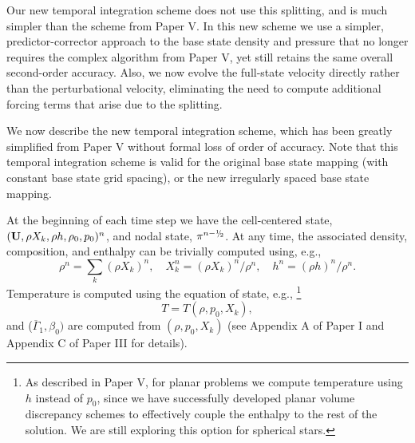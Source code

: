 \documentclass{aastex62}
\newcommand{\sfrac}[2]{\mathchoice
  {\kern0em\raise.5ex\hbox{\the\scriptfont0 #1}\kern-.15em/
   \kern-.15em\lower.25ex\hbox{\the\scriptfont0 #2}}
  {\kern0em\raise.5ex\hbox{\the\scriptfont0 #1}\kern-.15em/
   \kern-.15em\lower.25ex\hbox{\the\scriptfont0 #2}}
  {\kern0em\raise.5ex\hbox{\the\scriptscriptfont0 #1}\kern-.2em/
   \kern-.15em\lower.25ex\hbox{\the\scriptscriptfont0 #2}}
  {#1\!/#2}}
\newcommand{\myhalf}{\sfrac{1}{2}}
\newcommand{\Ub}{{\bf{U}}}
\newcommand{\gammaonebar}{\overline{\Gamma}_1}
\begin{document}
Our new temporal integration scheme does not use this splitting, and is much simpler than the scheme from Paper V.
In this new scheme we use a simpler, predictor-corrector approach to the base state density and pressure that no longer requires the complex algorithm from Paper V, yet still retains the same overall second-order accuracy.
Also, we now evolve the full-state velocity directly rather than the perturbational velocity, eliminating the need to compute additional forcing terms that arise due to the splitting.

We now describe the new temporal integration scheme, which has been greatly simplified
from Paper V without formal loss of order of accuracy.
Note that this temporal integration scheme is valid for the original base state mapping (with constant base state grid spacing), or the new irregularly spaced base state mapping.

At the beginning of each time step we have the cell-centered state,
$(\Ub,\rho X_k,\rho h,\rho_0,p_0)^n$, and nodal state, $\pi^{n-\myhalf}$.
At any time, the associated density, composition, and enthalpy can be trivially computed using, e.g.,
\begin{equation}
\rho^n = \sum_k(\rho X_k)^n, \quad
X_k^n = (\rho X_k)^n / \rho^n, \quad
h^n = (\rho h)^n / \rho^n.
\end{equation}
Temperature is computed using the equation of state, e.g.,
\footnote{As described in Paper V, for planar problems we compute temperature using $h$ instead of $p_0$, since we have successfully developed planar volume discrepancy schemes to effectively couple the enthalpy to the rest of the solution.  We are still exploring this option for spherical stars.}
\begin{equation}
T = T(\rho,p_0,X_k),
\end{equation}
and ($\gammaonebar,\beta_0)$ are computed from $(\rho,p_0,X_k)$ (see Appendix A of Paper I and Appendix C of Paper III for details).
\end{document}

